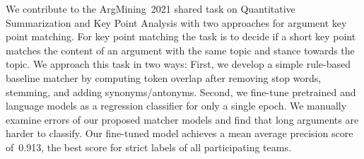 We contribute to the ArgMining~2021 shared task on Quantitative Summarization and Key Point Analysis with two approaches for argument key point matching. 
For key point matching the task is to decide if a short key point matches the content of an argument with the same topic and stance towards the topic. 
We approach this task in two ways: 
First, we develop a simple rule-based baseline matcher by computing token overlap after removing stop words, stemming, 
and adding synonyms/antonyms.
Second, we fine-tune pretrained \Bert and \Roberta language models as a regression classifier for only a single epoch. 
We manually examine errors of our proposed matcher models and find that long arguments are harder to classify. Our fine-tuned \RobertaBase model achieves a mean average precision score of~0.913, the best score for strict labels of all participating teams. 
